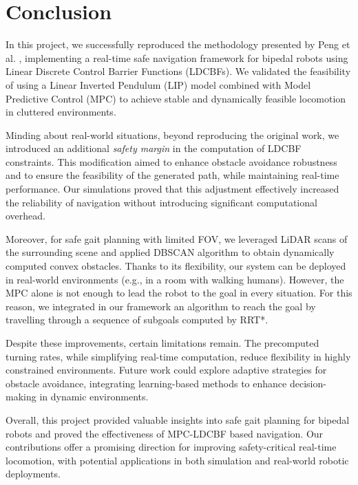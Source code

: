 \section{Conclusion}\label{sec:conclusions}
In this project, we successfully reproduced the methodology presented by Peng et al. \cite{peng_main_paper}, implementing a real-time
safe navigation framework for bipedal robots using Linear Discrete Control Barrier Functions (LDCBFs).
We validated the feasibility of using a Linear Inverted Pendulum (LIP) model combined with Model Predictive Control (MPC) to achieve stable and dynamically feasible locomotion in cluttered environments.

Minding about real-world situations, beyond reproducing the original work, we introduced an additional
\textit{safety margin} in the computation of LDCBF constraints.
This modification aimed to enhance obstacle avoidance robustness and to ensure the feasibility of the generated path, while maintaining
real-time performance.
Our simulations proved that this adjustment effectively increased the reliability of navigation without
introducing significant computational overhead.

Moreover, for safe gait planning with limited FOV, we leveraged LiDAR scans of the surrounding scene and applied DBSCAN
algorithm to obtain dynamically computed convex obstacles.
Thanks to its flexibility, our system can be deployed in real-world environments (e.g., in a room with walking humans).
However, the MPC alone is not enough to lead the robot to the goal in every situation. For this reason, we integrated in our framework an algorithm to reach the goal by travelling through a sequence of subgoals computed by RRT*.

Despite these improvements, certain limitations remain.
The precomputed turning rates, while simplifying real-time computation, reduce flexibility in highly constrained environments.
Future work could explore adaptive strategies for obstacle avoidance, integrating learning-based methods to enhance decision-making in dynamic environments.

Overall, this project provided valuable insights into safe gait planning for bipedal robots and proved the effectiveness of MPC-LDCBF based navigation.
Our contributions offer a promising direction for improving safety-critical real-time locomotion, with potential applications in both simulation and real-world robotic deployments.